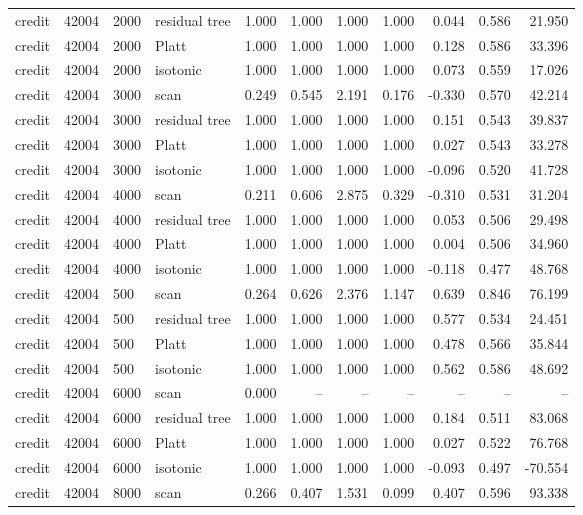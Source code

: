 \begin{tabular}{lrllrrrrrrr}
credit & 42004 & 2000 & residual tree & 1.000 & 1.000 & 1.000 & 1.000 & 0.044 & 0.586 & 21.950 \\
credit & 42004 & 2000 & Platt & 1.000 & 1.000 & 1.000 & 1.000 & 0.128 & 0.586 & 33.396 \\
credit & 42004 & 2000 & isotonic & 1.000 & 1.000 & 1.000 & 1.000 & 0.073 & 0.559 & 17.026 \\
credit & 42004 & 3000 & scan & 0.249 & 0.545 & 2.191 & 0.176 & -0.330 & 0.570 & 42.214 \\
credit & 42004 & 3000 & residual tree & 1.000 & 1.000 & 1.000 & 1.000 & 0.151 & 0.543 & 39.837 \\
credit & 42004 & 3000 & Platt & 1.000 & 1.000 & 1.000 & 1.000 & 0.027 & 0.543 & 33.278 \\
credit & 42004 & 3000 & isotonic & 1.000 & 1.000 & 1.000 & 1.000 & -0.096 & 0.520 & 41.728 \\
credit & 42004 & 4000 & scan & 0.211 & 0.606 & 2.875 & 0.329 & -0.310 & 0.531 & 31.204 \\
credit & 42004 & 4000 & residual tree & 1.000 & 1.000 & 1.000 & 1.000 & 0.053 & 0.506 & 29.498 \\
credit & 42004 & 4000 & Platt & 1.000 & 1.000 & 1.000 & 1.000 & 0.004 & 0.506 & 34.960 \\
credit & 42004 & 4000 & isotonic & 1.000 & 1.000 & 1.000 & 1.000 & -0.118 & 0.477 & 48.768 \\
credit & 42004 & 500 & scan & 0.264 & 0.626 & 2.376 & 1.147 & 0.639 & 0.846 & 76.199 \\
credit & 42004 & 500 & residual tree & 1.000 & 1.000 & 1.000 & 1.000 & 0.577 & 0.534 & 24.451 \\
credit & 42004 & 500 & Platt & 1.000 & 1.000 & 1.000 & 1.000 & 0.478 & 0.566 & 35.844 \\
credit & 42004 & 500 & isotonic & 1.000 & 1.000 & 1.000 & 1.000 & 0.562 & 0.586 & 48.692 \\
credit & 42004 & 6000 & scan & 0.000 & -- & -- & -- & -- & -- & -- \\
credit & 42004 & 6000 & residual tree & 1.000 & 1.000 & 1.000 & 1.000 & 0.184 & 0.511 & 83.068 \\
credit & 42004 & 6000 & Platt & 1.000 & 1.000 & 1.000 & 1.000 & 0.027 & 0.522 & 76.768 \\
credit & 42004 & 6000 & isotonic & 1.000 & 1.000 & 1.000 & 1.000 & -0.093 & 0.497 & -70.554 \\
credit & 42004 & 8000 & scan & 0.266 & 0.407 & 1.531 & 0.099 & 0.407 & 0.596 & 93.338 \\

\end{tabular}
